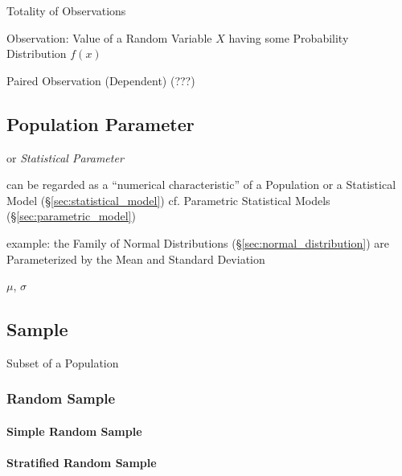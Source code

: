 Totality of Observations

Observation: Value of a Random Variable $X$ having some Probability
Distribution $f(x)$

Paired Observation (Dependent) (???)



\subsection{Population Parameter}\label{sec:population_parameter}

or \emph{Statistical Parameter}

can be regarded as a ``numerical characteristic'' of a Population or a
Statistical Model (\S\ref{sec:statistical_model}) \fist cf. Parametric
Statistical Models (\S\ref{sec:parametric_model})

example: the Family of Normal Distributions (\S\ref{sec:normal_distribution})
are Parameterized by the Mean and Standard Deviation

$\mu$, $\sigma$



\subsection{Sample}\label{sec:sample}

Subset of a Population



\subsubsection{Random Sample}\label{sec:random_sample}

\paragraph{Simple Random Sample}\label{sec:simple_random_sample}\hfill

\paragraph{Stratified Random Sample}\label{sec:stratified_random_sample}\hfill



